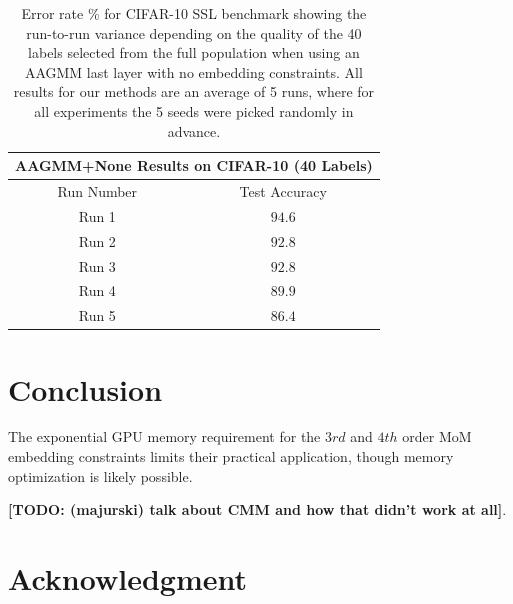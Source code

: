 \documentclass[10pt,twocolumn,letterpaper]{article}
\newcommand{\TODO}[1]{\textbf{\color{red}[TODO: #1]}}
\begin{document}
\begin{table}[htbp]
	\begin{tabular}{c|c}
		\multicolumn{2}{c}{AAGMM+None Results on CIFAR-10 (40 Labels)}\\
		\hline
		Run Number            & Test Accuracy \\ 
		\hline
		Run 1   & $94.6$     \\ 
		Run 2   & $92.8$    \\
		Run 3   & $92.8$ \\
		Run 4   & $89.9$ \\
		Run 5   & $86.4$ \\ 
		
	\end{tabular}
	\caption{Error rate \% for CIFAR-10 SSL benchmark showing the run-to-run variance depending on the quality of the 40 labels selected from the full population when using an AAGMM last layer with no embedding constraints. All results for our methods are an average of 5 runs, where for all experiments the 5 seeds were picked randomly in advance.}
	\label{table4}
\end{table}




\section{Conclusion}

The exponential GPU memory requirement for the $3rd$ and $4th$ order MoM embedding constraints limits their practical application, though memory optimization is likely possible.

\TODO{(majurski) talk about CMM and how that didn't work at all}.


\section{Acknowledgment}


{
	\small
	
	
}
\end{document}
